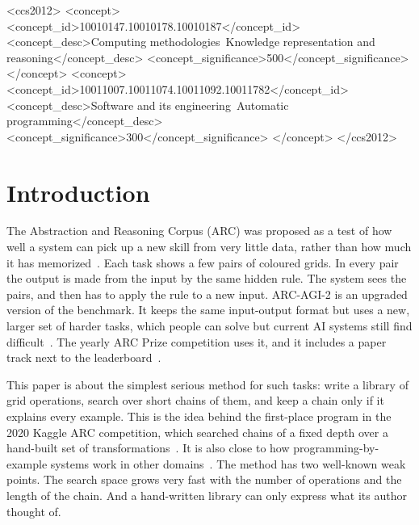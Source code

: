 \documentclass[sigconf,nonacm]{acmart}
\begin{document}
\begin{CCSXML}
<ccs2012>
<concept>
<concept_id>10010147.10010178.10010187</concept_id>
<concept_desc>Computing methodologies~Knowledge representation and reasoning</concept_desc>
<concept_significance>500</concept_significance>
</concept>
<concept>
<concept_id>10011007.10011074.10011092.10011782</concept_id>
<concept_desc>Software and its engineering~Automatic programming</concept_desc>
<concept_significance>300</concept_significance>
</concept>
</ccs2012>
\end{CCSXML}



\maketitle

\section{Introduction}

The Abstraction and Reasoning Corpus (ARC) was proposed as a test of how well a system can pick up a new skill from very little data, rather than how much it has memorized~\cite{chollet2019measure}. Each task shows a few pairs of coloured grids. In every pair the output is made from the input by the same hidden rule. The system sees the pairs, and then has to apply the rule to a new input. ARC-AGI-2 is an upgraded version of the benchmark. It keeps the same input-output format but uses a new, larger set of harder tasks, which people can solve but current AI systems still find difficult~\cite{chollet2025arcagi2}. The yearly ARC Prize competition uses it, and it includes a paper track next to the leaderboard~\cite{chollet2024arcprize}.

This paper is about the simplest serious method for such tasks: write a library of grid operations, search over short chains of them, and keep a chain only if it explains every example. This is the idea behind the first-place program in the 2020 Kaggle ARC competition, which searched chains of a fixed depth over a hand-built set of transformations~\cite{kaggle2020arc,wind2020arcsolution}. It is also close to how programming-by-example systems work in other domains~\cite{gulwani2011flashfill}. The method has two well-known weak points. The search space grows very fast with the number of operations and the length of the chain. And a hand-written library can only express what its author thought of.
\end{document}
